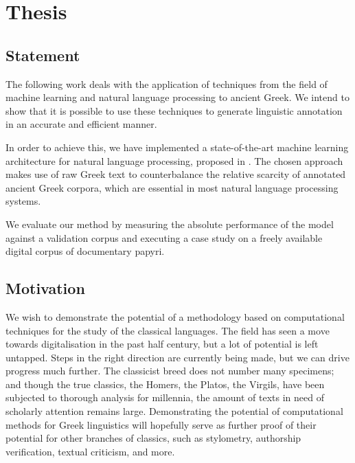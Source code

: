 \chapter{Thesis} 
\label{chp:introduction}
\section{Statement}

The following work deals with the application of techniques from the
field of machine learning and natural language processing to ancient
Greek. We intend to show that it is possible to use these techniques
to generate linguistic annotation in an accurate and efficient manner.

In order to achieve this, we have implemented a state-of-the-art machine
learning architecture for natural language processing, proposed in
\cite{collobert2008,collobert-2011}. The chosen approach makes use of
raw Greek text to counterbalance the relative scarcity of annotated
ancient Greek corpora, which are essential in most natural language
processing systems.

We evaluate our method by measuring the absolute performance of the
model against a validation corpus and executing a case study on a
freely available digital corpus of documentary papyri.

\section{Motivation}
We wish to demonstrate the potential of a methodology based on
computational techniques for the study of the classical languages. The
field has seen a move towards digitalisation in the past half century,
but a lot of potential is left untapped. Steps in the right direction
are currently being made, but we can drive progress much further. The
classicist breed does not number many specimens; and though the true
classics, the Homers, the Platos, the Virgils, have been subjected to
thorough analysis for millennia, the amount of texts in need of
scholarly attention remains large. Demonstrating the potential of
computational methods for Greek linguistics will hopefully serve as
further proof of their potential for other branches of classics, such
as stylometry, authorship verification, textual criticism, and more.

